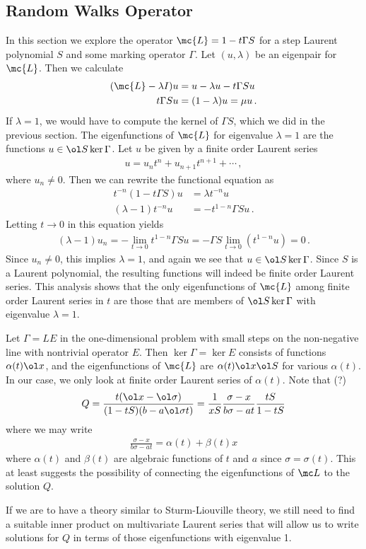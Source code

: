 \subsection{Random Walks Operator}
In this section we explore the operator $\mc{L} = 1 - t\Gamma S$ for a step Laurent polynomial $S$ and some marking operator $\Gamma$. Let $(u, \lambda)$ be an eigenpair for $\mc{L}$. Then we calculate
\begin{align}\begin{split}
	(\mc{L}-\lambda I) u &= u - \lambda u -t\Gamma Su\\
	t \Gamma S u &= (1-\lambda)u = \mu u\,.
\end{split}\end{align}
If $\lambda = 1$, we would have to compute the kernel of $\Gamma S$, which we did in the previous section. The eigenfunctions of $\mc{L}$ for eigenvalue $\lambda = 1$ are the functions $u \in \ol S\ker{\Gamma}$. Let $u$ be given by a finite order Laurent series
\begin{align}
	u = u_n t^n + u_{n+1}t^{n+1} + \cdots\,,
\end{align}
where $u_n \neq 0$. Then we can rewrite the functional equation as
\begin{align}
	t^{-n}(1-t\Gamma S)u &= \lambda t^{-n}u\\
	(\lambda -1) t^{-n}u &= -t^{1-n}\Gamma Su\,.
\end{align}
Letting $t \to 0$ in this equation yields
\begin{align}
	(\lambda - 1)u_n = -\lim_{t\to 0} t^{1-n}\Gamma S u = -\Gamma S \lim_{t\to 0} (t^{1-n} u) = 0\,.
\end{align}
Since $u_n \neq 0$, this implies $\lambda = 1$, and again we see that $u \in \ol S\ker \Gamma$. Since $S$ is a Laurent polynomial, the resulting functions will indeed be finite order Laurent series. This analysis shows that the only eigenfunctions of $\mc{L}$ among finite order Laurent series in $t$ are those that are members of $\ol S \ker \Gamma$ with eigenvalue $\lambda = 1$.
\begin{example} Let $\Gamma = LE$ in the one-dimensional problem with small steps on the non-negative line with nontrivial operator $E$. Then $\ker \Gamma = \ker E$ consists of functions $\alpha(t) \ol x$, and the eigenfunctions of $\mc{L}$ are $\alpha(t)\ol x \ol S$ for various $\alpha(t)$. In our case, we only look at finite order Laurent series of $\alpha(t)$. Note that (?)
\begin{align}
	Q = \frac{t(\ol x - \ol \sigma)}{(1-tS)(b-a\ol \sigma t)} = \frac{1}{xS}\frac{\sigma - x}{b\sigma - at}\frac{tS}{1-tS}
\end{align}
where we may write
\begin{align}
	\frac{\sigma - x}{b\sigma - at} = \alpha(t) + \beta(t)x
\end{align}
where $\alpha(t)$ and $\beta(t)$ are algebraic functions of $t$ and $a$ since $\sigma = \sigma(t)$. This at least suggests the possibility of connecting the eigenfunctions of $\mc L$ to the solution $Q$.
\end{example}

If we are to have a theory similar to Sturm-Liouville theory, we still need to find a suitable inner product on multivariate Laurent series that will allow us to write solutions for $Q$ in terms of those eigenfunctions with eigenvalue 1.



\endinput